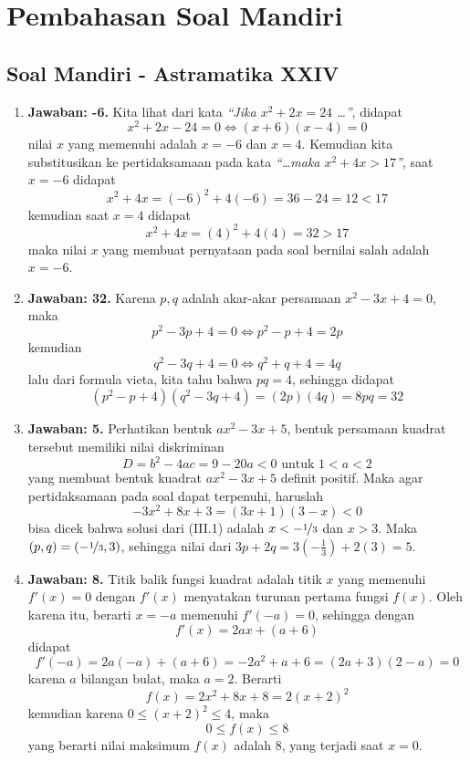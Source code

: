 \chapter{Pembahasan Soal Mandiri}
\hrulefill

\section{Soal Mandiri - Astramatika XXIV}
\begin{enumerate}

\item \textbf{Jawaban: -6.} Kita lihat dari kata \emph{``Jika $x^2+2x=24$ \ldots''}, didapat $$x^2+2x-24 = 0\Leftrightarrow (x+6)(x-4) = 0$$nilai $x$ yang memenuhi adalah $x=-6$ dan $x=4$. Kemudian kita substitusikan ke pertidaksamaan pada kata \emph{``\ldots maka $x^2+4x>17$''}, saat $x = -6$ didapat $$x^2 + 4x = (-6)^2 + 4(-6) = 36 - 24 = 12 < 17$$kemudian saat $x=4$ didapat $$x^2+4x = (4)^2 + 4(4) = 32 > 17$$maka nilai $x$ yang membuat pernyataan pada soal bernilai salah adalah $x=-6$.

\item \textbf{Jawaban: 32.} Karena $p,q$ adalah akar-akar persamaan $x^2-3x+4=0,$ maka $$p^2-3p+4 =0\Leftrightarrow p^2-p+4 = 2p$$kemudian$$q^2-3q+4 = 0\Leftrightarrow q^2+q+4=4q$$lalu dari formula vieta, kita tahu bahwa $pq = 4$, sehingga didapat $$(p^2-p+4)(q^2-3q+4) = (2p)(4q) = 8pq = 32$$

\item \textbf{Jawaban: 5.} Perhatikan bentuk $ax^2-3x+5$, bentuk persamaan kuadrat tersebut memiliki nilai diskriminan $$D = b^2-4ac = 9-20a < 0\text{ untuk $1<a<2$}$$yang membuat bentuk kuadrat $ax^2-3x+5$ definit positif. Maka agar pertidaksamaan pada soal dapat terpenuhi, haruslah \begin{equation}-3x^2+8x+3 = (3x+1)(3-x) < 0\end{equation}bisa dicek bahwa solusi dari (III.1) adalah $x<-\nicefrac{1}{3}$ dan $x>3$. Maka $(p,q) = (-\nicefrac{1}{3}, 3)$, sehingga nilai dari $3p +2q = 3(-\frac{1}{3}) + 2(3) = 5.$

\item \textbf{Jawaban: 8.} Titik balik fungsi kuadrat adalah titik $x$ yang memenuhi $f'(x) = 0$ dengan $f'(x)$ menyatakan turunan pertama fungsi $f(x)$. Oleh karena itu, berarti $x=-a$ memenuhi $f'(-a) = 0$, sehingga dengan $$f'(x) = 2ax + (a+6)$$didapat$$f'(-a) = 2a(-a)+(a+6) = -2a^2+a+6 = (2a+3)(2-a) = 0$$karena $a$ bilangan bulat, maka $a=2$. Berarti $$f(x) = 2x^2+8x+8 = 2(x+2)^2$$kemudian karena $0\leq (x+2)^2 \leq 4$, maka $$0\leq f(x)\leq 8$$ yang berarti nilai maksimum $f(x)$ adalah 8, yang terjadi saat $x=0$.


\end{enumerate}
